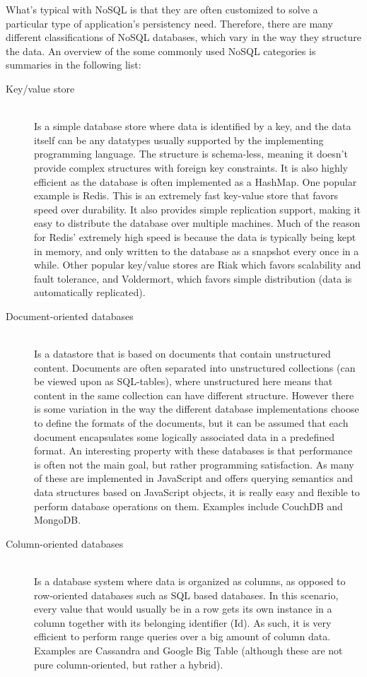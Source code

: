 What's typical with NoSQL is that they are often customized to solve a particular type of application's persistency need. Therefore, there are many different classifications of NoSQL databases, which vary in the way they structure the data. An overview of the some commonly used NoSQL categories is summaries in the following list:
\begin{description}
  \item[Key/value store] \hfill \\
	Is a simple database store where data is identified by a key, and the data itself can be any datatypes usually supported by the implementing programming language. The structure is schema-less, meaning it doesn't provide complex structures with foreign key constraints. It is also highly efficient as the database is often implemented as a HashMap. One popular example is Redis\cite{redis}. This is an extremely fast key-value store that favors speed over durability. It also provides simple replication support, making it easy to distribute the database over multiple machines. Much of the reason for Redis' extremely high speed is because the data is typically being kept in memory, and only written to the database as a snapshot every once in a while. Other popular key/value stores are Riak\cite{riak} which favors scalability and fault tolerance, and Voldermort\cite{voldermort}, which favors simple distribution (data is automatically replicated). 
	
  \item[Document-oriented databases] \hfill \\
  Is a datastore that is based on documents that contain unstructured content. Documents are often separated into unstructured collections (can be viewed upon as SQL-tables), where unstructured here means that content in the same collection can have different structure. However there is some variation in the way the different database implementations choose to define the formats of the documents, but it can be assumed that each document encapsulates some logically associated data in a predefined format. An interesting property with these databases is that performance is often not the main goal, but rather programming satisfaction. As many of these are implemented in JavaScript and offers querying semantics and data structures based on JavaScript objects, it is really easy and flexible to perform database operations on them. Examples include CouchDB\cite{couch} and MongoDB\cite{mongo}.
  
  \item[Column-oriented databases] \hfill \\
  Is a database system where data is organized as columns, as opposed to row-oriented databases such as SQL based databases. In this scenario, every value that would usually be in a row gets its own instance in a column together with its belonging identifier (Id). As such, it is very efficient to perform range queries over a big amount of column data. Examples are Cassandra\cite{cassandra} and Google Big Table \cite{bigtable} (although these are not pure column-oriented, but rather a hybrid). 
\end{description}

